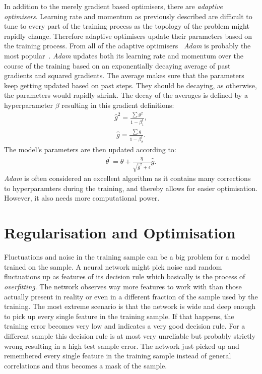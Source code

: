 In addition to the merely gradient based optimisers, there are \emph{adaptive optimisers}. Learning rate and momentum as previously described are difficult to tune to every part of the training process as the topology of the problem might rapidly change. Therefore adaptive optimisers update their parameters based on the training process. From all of the adaptive optimisers~\cite{chollet2015keras} \emph{Adam} is probably the most popular~\cite{2014arXiv1412.6980K}. \emph{Adam} updates both its learning rate and momentum over the course of the training based on an exponentially decaying average of past gradients and squared gradients. The average makes sure that the parameters keep getting updated based on past steps. They should be decaying, as otherwise, the parameters would rapidly shrink. The decay of the averages is defined by a hyperparameter $\beta$ resulting in this gradient definitions:
%
\begin{align}
    \hat{g}^2 = \frac{\sum g^2}{1 - \beta_1^t},
\end{align}
%
\begin{align}
    \hat{g} = \frac{\sum g}{1 - \beta_2^t}.
\end{align}
%
The model's parameters are then updated according to:
%
\begin{align}
    \theta^{\prime} = \theta + \frac{\eta}{\sqrt{\hat{g}^2} + \epsilon} \hat{g}.
\end{align}
%
\emph{Adam} is often considered an excellent algorithm as it contains many corrections to hyperparamters during the training, and thereby allows for easier optimisation. However, it also needs more computational power.


\section{Regularisation and Optimisation}

Fluctuations and noise in the training sample can be a big problem for a model trained on the sample. A neural network might pick noise and random fluctuations up as features of its decision rule which basically is the process of \emph{overfitting}.
The network observes way more features to work with than those actually present in reality or even in a different fraction of the sample used by the training. The most extreme scenario is that the network is wide and deep enough to pick up every single feature in the training sample. If that happens, the training error becomes very low and indicates a very good decision rule. For a different sample this decision rule is at most very unreliable but probably strictly wrong resulting in a high test sample error. The network just picked up and remembered every single feature in the training sample instead of general correlations and thus becomes a mask of the sample.

